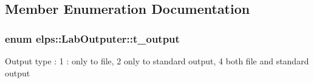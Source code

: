 \subsection{Member Enumeration Documentation}
\hypertarget{classelps_1_1_lab_outputer_ad470fb25f86cffd24bc24c56414d5be5}{
\subsubsection[{t\+\_\+output}]{\setlength{\rightskip}{0pt plus 5cm}enum {\bf elps\+::\+Lab\+Outputer\+::t\+\_\+output}}}\label{classelps_1_1_lab_outputer_ad470fb25f86cffd24bc24c56414d5be5}
Output type \+: 1 \+: only to file, 2 only to standard output, 4 both file and standard output 

